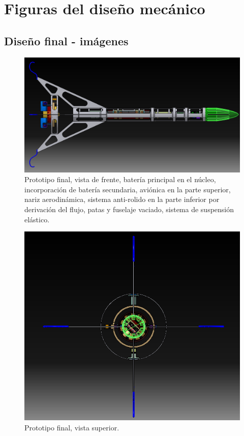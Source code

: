 \section{Figuras del diseño mecánico}


\null\newpage
\clearpage

\subsection{Diseño final - imágenes}

\begin{figure}[htb]
    \centering
    \includegraphics[width=\linewidth]{fig/design/v6}
    \caption{Prototipo final, vista de frente, batería principal en el núcleo, incorporación de batería secundaria, aviónica en la parte superior, nariz aerodinámica, sistema anti-rolido en la parte inferior por derivación del flujo, patas y fuselaje vaciado, sistema de suspensión elástico.}
    \label{fig:design/v6}
\end{figure}

\begin{figure}[htb]
    \centering
    \includegraphics[width=0.8\linewidth]{fig/design/v6_1}
    \caption{Prototipo final, vista superior.}
    \label{fig:design/v6_1}
\end{figure}


